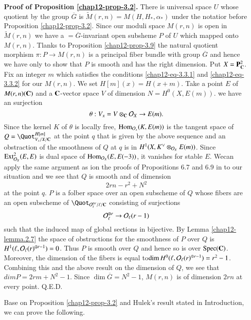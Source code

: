 \medskip
\noindent
{\bfseries  Proof of Proposition \ref{chap12-prop-3.2}.} There is universal space $U$ whose quotient by the group $\overline{G}$ is $\tilde{M}(r, n)=M(H, H_{*}, \alpha_{*})$ under the notatior before Proposition \ref{chap12-prop-3.2}. Since our moduli space $M(r,n)$ is open in $\tilde{M}(r,n)$ we have a $=\overline{G}$-invariant open subsheme $P$ of $U$ which mapped onto $M(r, n)$. Tlanks to Proposition \ref{chap12-prop-3.9} the natural quotient morphism $\pi : P \rightarrow M (r, n)$ is a principal fiber bundle with group $\overline{G}$ and hence we have only to show that $P$ is smooth and has the right dimension. Put $X=\mathbf{P}_{\mathbf{C}}^{2}$. Fix an integer $m$ which satisfies the conditions
\eqref{chap12-eq-3.3.1} and \eqref{chap12-eq-3.3.2} for our $M(r, n)$. We set $H[m](x) =H(x +m)$. Take a point $E$ of
$M(r, n)(\mathbf{C})$ and a $\mathbf{C}$-vector space $V$ of dimension $N=H^{0}(X, E(m))$. we have an surjection
$$
\theta : V_{x}=V\otimes_{\mathbf{C}} \mathcal{O}_{X}\rightarrow E(m).
$$
Since the kernel $K$ of $\theta$ is locally free, $\operatorname{Hom}_{\mathcal{O}_{x}}(K, E(m))$ is the tangent space of $Q=\Quot_{V_{x}/X/\bC}^{H[m]}$ at the point $q$ that is given by the above sequence and an obstraction of the smoothness of $Q$ at $q$ is in $H^{1}(X, K^{\vee} \otimes_{\mathcal{O}_{X}}E(m))$. Since $\operatorname{Ext}_{\mathcal{O}_{X}}^{2}(E, E)$ is dual space of $\operatorname{Hom}_{\mathcal{O}_{X}}(E, E(-3))$, it vanishes for stable $E$. We\pageoriginale can apply the same argument as ion the proofs of Propositions 6.7 and 6.9 in \cite{chap12-key5} to our situation and we see that $Q$ is smooth and of dimension
$$
2rn-r^{2} + N^{2}
$$
at the point $q$. $P$ is a folber space over an open subscheme of $Q$ whose fibers are an open subscheme of $\Quot_{\calO_{\ell}^{\oplus r}/\ell/\bC}$ consisting of surjections
$$
\mathcal{O}_{\ell}^{\oplus r} \rightarrow \mathcal{O}_{\ell}(r-1)
$$ 
such that the induced map of global sections in bijective. By Lemma \ref{chap12-lemma.2.7} the space of obstructions for the smoothness of $P$ over $Q$ is\break $H^{1} (\ell,\mathcal{O}_{\ell}(r)^{\oplus r-1}) =0$. Thus $P$ is smooth over $Q$ and hence so is over $\operatorname{Spec}(\mathbf{C})$. Moreover, the dimension of the fibers is equal to\break $\dim H^{0}(\ell, \mathcal{O}_{\ell}(r)^{\oplus r-1})=r^{2}-1 $. Combining this and the above result on the dimension of $Q$, we see that $dim P=2rm +N^{2}-1$. Since $\dim\overline{G}=N^{2}-1$, $M(r,n)$ is of dimension $2rn$ at every point.
\hfill Q.E.D.

Base on Proposition \ref{chap12-prop-3.2} and Hulek's result stated in Introduction, we can prove the following.

